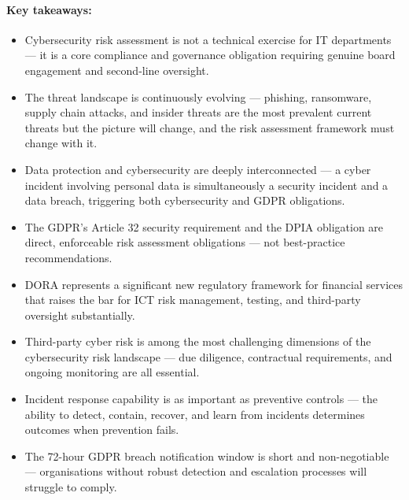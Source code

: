 \paragraph{Key takeaways:}
\begin{itemize}
  \item{Cybersecurity risk assessment is not a technical exercise for IT departments — it is a core compliance and governance obligation requiring genuine board engagement and second-line oversight.}
  \item{The threat landscape is continuously evolving — phishing, ransomware, supply chain attacks, and insider threats are the most prevalent current threats but the picture will change, and the risk assessment framework must change with it.}
  \item{Data protection and cybersecurity are deeply interconnected — a cyber incident involving personal data is simultaneously a security incident and a data breach, triggering both cybersecurity and GDPR obligations.}
  \item{The GDPR's Article 32 security requirement and the DPIA obligation are direct, enforceable risk assessment obligations — not best-practice recommendations.}
  \item{DORA represents a significant new regulatory framework for financial services that raises the bar for ICT risk management, testing, and third-party oversight substantially.}
  \item{Third-party cyber risk is among the most challenging dimensions of the cybersecurity risk landscape — due diligence, contractual requirements, and ongoing monitoring are all essential.}
  \item{Incident response capability is as important as preventive controls — the ability to detect, contain, recover, and learn from incidents determines outcomes when prevention fails.}
  \item{The 72-hour GDPR breach notification window is short and non-negotiable — organisations without robust detection and escalation processes will struggle to comply.}
\end{itemize}

